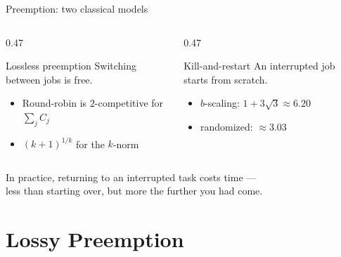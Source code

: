 \documentclass[aspectratio=169,11pt]{beamer}
\newcommand{\src}[2][]{{\footnotesize\color{ztgray}%
  \if\relax\detokenize{#1}\relax\cite{#2}\else\cite[#1]{#2}\fi}}
\begin{document}
\begin{frame}{Preemption: two classical models}
  \begin{columns}[t]
    \begin{column}{0.47\textwidth}
      \begin{block}{Lossless preemption}
        Switching between jobs is free.
        \begin{itemize}
          \item Round-robin is $2$-competitive for $\sum_j C_j$ \src{mpt94}
          \item $(k+1)^{1/k}$ for the $k$-norm \src{mv22}
        \end{itemize}
      \end{block}
    \end{column}
    \begin{column}{0.47\textwidth}
      \begin{block}{Kill-and-restart}
        An interrupted job starts from scratch.
        \begin{itemize}
          \item $b$-scaling: $1 + 3\sqrt{3} \approx 6.20$
          \item randomized: $\approx 3.03$ \src{jssw25}
        \end{itemize}
      \end{block}
    \end{column}
  \end{columns}
  \vfill
  \begin{center}
    In practice, returning to an interrupted task costs time ---\\
    \alert{less than starting over, but more the further you had come.}
  \end{center}
\end{frame}

\section[Model]{Lossy Preemption}
\end{document}
